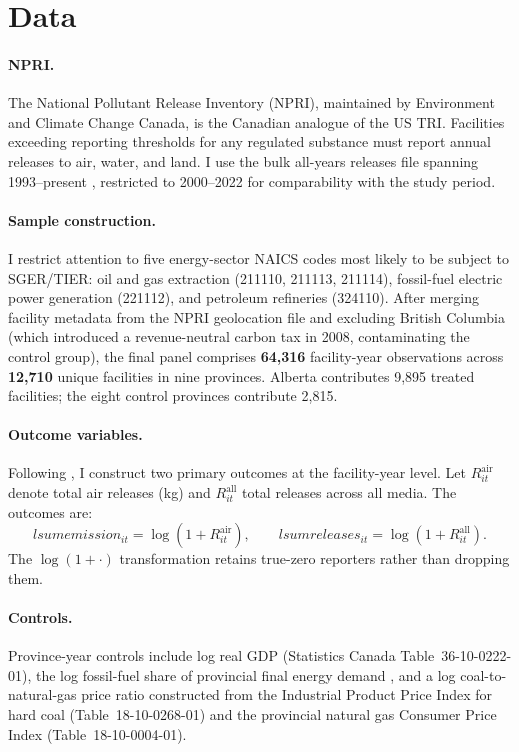 \documentclass[12pt]{article}
\begin{document}
\section{Data}

\paragraph{NPRI.}
The National Pollutant Release Inventory (NPRI), maintained by Environment
and Climate Change Canada, is the Canadian analogue of the US TRI.
Facilities exceeding reporting thresholds for any regulated substance must
report annual releases to air, water, and land.
I use the bulk all-years releases file spanning 1993--present
\citep{eccc2024}, restricted to 2000--2022 for comparability with the
\citet{pham2024} study period.

\paragraph{Sample construction.}
I restrict attention to five energy-sector NAICS codes most likely to be
subject to SGER/TIER: oil and gas extraction (211110, 211113, 211114),
fossil-fuel electric power generation (221112), and petroleum refineries
(324110).
After merging facility metadata from the NPRI geolocation file and excluding
British Columbia (which introduced a revenue-neutral carbon tax in 2008,
contaminating the control group), the final panel comprises
\textbf{64,316} facility-year observations across
\textbf{12,710} unique facilities in nine provinces.
Alberta contributes 9,895 treated facilities; the eight control provinces
contribute 2,815.

\paragraph{Outcome variables.}
Following \citet{pham2024}, I construct two primary outcomes at the
facility-year level.
Let $R^{\mathrm{air}}_{it}$ denote total air releases (kg) and
$R^{\mathrm{all}}_{it}$ total releases across all media.
The outcomes are:
\[
  \mathit{lsumemission}_{it} = \log\!\left(1 + R^{\mathrm{air}}_{it}\right),
  \qquad
  \mathit{lsumreleases}_{it} = \log\!\left(1 + R^{\mathrm{all}}_{it}\right).
\]
The $\log(1+\cdot)$ transformation retains true-zero reporters rather than
dropping them.

\paragraph{Controls.}
Province-year controls include log real GDP (Statistics Canada
Table~36-10-0222-01), the log fossil-fuel share of provincial final energy
demand \citep{statcan2024}, and a log coal-to-natural-gas price ratio
constructed from the Industrial Product Price Index for hard coal
(Table~18-10-0268-01) and the provincial natural gas Consumer Price Index
(Table~18-10-0004-01).
\end{document}
